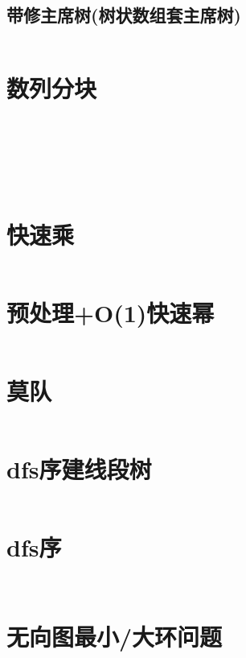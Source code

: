 \documentclass[a4paper,11pt]{article}
\begin{document}
\subsection*{带修主席树(树状数组套主席树)}
\inputminted[]{c++}{Template/DataStructure/ChairManTreeII.cpp}

\newpage
\section*{数列分块}
\inputminted[]{c++}{Template/Other/SeqBlockI.cpp}
\newpage
\inputminted[]{c++}{Template/Other/SeqBlockII.cpp}
\newpage
\inputminted[]{c++}{Template/Other/SeqBlockIII.cpp}
\newpage
\inputminted[]{c++}{Template/Other/SeqBlockIV.cpp}
\newpage
\inputminted[]{c++}{Template/Other/SeqBlockV.cpp}
\newpage
\inputminted[]{c++}{Template/Other/SeqBlockVI.cpp}
\newpage
\inputminted[]{c++}{Template/Other/SeqBlockVII.cpp}
\newpage
\section*{快速乘}
\inputminted[]{c++}{Template/Other/qMul.cpp}
\section*{预处理+O(1)快速幂}
\inputminted[]{c++}{Template/Other/PowMod.cpp}

\newpage
\section*{莫队}
\inputminted[]{c++}{Template/Segment/Mo.cpp}
\newpage
\section*{dfs序建线段树}
\inputminted[]{c++}{Template/Segment/dfsSegTree.cpp}
\newpage
\section*{dfs序}
\inputminted[]{c++}{Template/Segment/dfs.cpp}
\newpage
\inputminted[]{c++}{Template/Other/cdq_3d_lis.cpp}

\newpage
\section*{无向图最小/大环问题}
\end{document}

